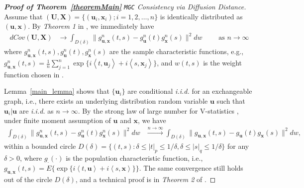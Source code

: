 \documentclass[11pt]{article}
\theoremstyle{definition}
\begin{document}
\begin{proof}[\textbf{Proof of Theorem~\ref{theoremMain}} \texttt{MGC} Consistency via Diffusion Distance]

Assume that $(\mathbf{U}, \mathbf{X}) = \{ (\mathbf{u}_{i}, \mathbf{x}_{i}) ; i = 1,2, \ldots, n \}$ is identically distributed as $(\mathbf{u}, \mathbf{x})$. By \textit{Theorem 1} in \cite{szekely2007measuring}, we immediately have
\begin{eqnarray}
dCov(\mathbf{U},\mathbf{X}) &\longrightarrow \int_{D(\delta)}{\|g_{\mathbf{u},\mathbf{x}}^{n}(t,s)-g_{\mathbf{u}}^{n}(t)g_{\mathbf{x}}^{n}(s)\|^{2}}dw \quad \quad \mbox{ as } n \rightarrow \infty
\label{eq:conv1}
\end{eqnarray}
where $g_{\mathbf{u},\mathbf{x}}^{n}(t,s), g_{\mathbf{u}}^{n}(t), g_{\mathbf{x}}^{n}(s)$ are the sample characteristic functions, e.g., $g_{\mathbf{u},\mathbf{x}}^{n}(t,s)=\frac{1}{n}\sum_{j=1}^{n}\exp\{i \left\langle t,\mathbf{u}_{j} \right\rangle  +i \left\langle  s,\mathbf{x}_{j}\right\rangle \}$, and $w(t,s)$ is the weight function chosen in \cite{szekely2007measuring}. %

Lemma~\ref{main_lemma} shows that $\{ \mathbf{u}_{i} \}$ are conditional \textit{i.i.d.} for an exchangeable graph, i.e., there exists an underlying distribution random variable $\mathbf{u}$ such that $\mathbf{u}_{i}|\mathbf{u}$ are \textit{i.i.d.} as $n \rightarrow \infty$. By the strong law of large number for V-statistics \cite{KoroljukBook}, under finite moment assumption of $\mathbf{u}$ and $\mathbf{x}$, we have 
\begin{eqnarray}
\displaystyle\int_{D(\delta)}{\|g_{\mathbf{u},\mathbf{x}}^{n}(t,s)-g_{\mathbf{u}}^{n}(t)g_{\mathbf{x}}^{n}(s)\|^{2}}dw &\stackrel{n \rightarrow \infty}{\longrightarrow} 
\displaystyle\int_{D(\delta)}{\|g_{\mathbf{u},\mathbf{x}}(t,s)-g_{\mathbf{u}}(t)g_{\mathbf{x}}(s)\|^{2}}dw,
\label{eq:SLLN}
\end{eqnarray}
within a bounded circle $D(\delta)=\{(t,s):\delta \leq |t|_{p} \leq 1/\delta,\delta \leq |s|_{q} \leq 1/\delta\}$ for any $\delta>0$, where $g_{\cdot}(\cdot)$ is the population characteristic function, i.e., $g_{\mathbf{u},\mathbf{x}}(t,s) = E\{\exp\{i \left\langle t,\mathbf{u} \right\rangle  +i \left\langle  s,\mathbf{x}\right\rangle \}\}$. The same convergence still holds out of the circle $D(\delta)$, and a technical proof is in \textit{Theorem 2} of \cite{szekely2007measuring}.


\end{proof}
\end{document}
